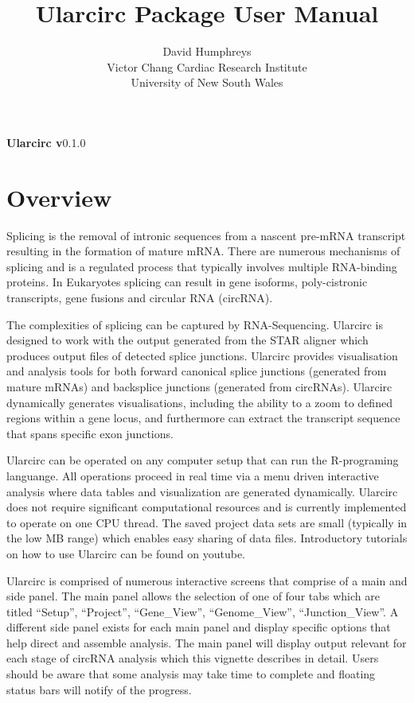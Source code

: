 \documentclass[12pt]{article}
\title{Ularcirc Package User Manual}
\author{David Humphreys\\
Victor Chang Cardiac Research Institute\\
University of New South Wales
}
\begin{document}
\maketitle

\begin{center}
\textbf{Ularcirc v}0.1.0
\end{center}

\tableofcontents



\section{Overview} \label{sec:praeludium}

\indent Splicing is the removal of intronic sequences from a nascent pre-mRNA transcript resulting in the formation of mature mRNA. There are numerous mechanisms of splicing and is a regulated process that typically involves multiple RNA-binding proteins. In Eukaryotes splicing can result in gene isoforms, poly-cistronic transcripts, gene fusions and circular RNA (circRNA). \par
 The complexities of splicing  can be captured by RNA-Sequencing. Ularcirc is designed to work with the output generated from the STAR aligner which produces output files of detected splice junctions. Ularcirc provides visualisation and analysis tools for both forward canonical splice junctions (generated from mature mRNAs) and backsplice junctions (generated from circRNAs). Ularcirc dynamically generates visualisations, including the ability to a zoom to defined regions within a gene locus, and furthermore can extract the transcript sequence that spans specific exon junctions. \par
 Ularcirc can be operated on any computer setup that can run the R-programing languange. All operations proceed in real time via a menu driven interactive analysis where data tables and visualization are generated dynamically. Ularcirc does not require significant computational resources and is currently implemented to operate on one CPU thread. The saved project data sets are small (typically in the low MB range) which enables easy sharing of data files. Introductory tutorials on how to use Ularcirc can be found on youtube. \par
Ularcirc is comprised of numerous interactive screens that comprise of a main and side panel. The main panel allows the selection of one of four tabs which are titled ``Setup'', ``Project'', ``Gene\_View'', ``Genome\_View'', ``Junction\_View''. A different side panel exists for each main panel and display  specific options that help direct and assemble analysis. The main panel will display output relevant for each stage of circRNA analysis which this vignette describes in detail. Users should be aware that some analysis may take time to complete and floating status bars will notify of the progress.
\end{document}
